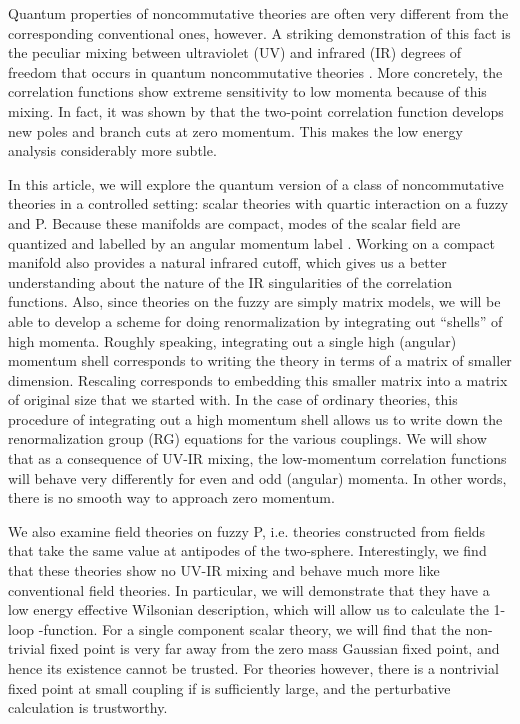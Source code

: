 \documentclass[a4paper,12pt]{article}
\numberwithin{equation}{section}
\begin{document}
Quantum properties of noncommutative theories are often very different
from the corresponding conventional ones, however. A striking
demonstration of this fact is the peculiar mixing between ultraviolet
(UV) and infrared (IR) degrees of freedom that occurs in quantum
noncommutative theories \cite{mrs}. More concretely, the correlation
functions show extreme sensitivity to low momenta because of this
mixing. In fact, it was shown by \cite{mrs} that the two-point
correlation function develops new poles and branch cuts at zero
momentum. This makes the low energy analysis considerably more subtle.

In this article, we will explore the quantum version of a class of
noncommutative theories in a controlled setting: scalar theories with
quartic interaction on a fuzzy \coordHE{} and \coordHE{}P\coordHE{}. Because
these manifolds are compact, modes of the scalar field are quantized
and labelled by an angular momentum label \coordHE{}. Working on a compact
manifold also provides a natural infrared cutoff, which gives us a
better understanding about the nature of the IR singularities of the
correlation functions. Also, since theories on the fuzzy \coordHE{} are
simply matrix models, we will be able to develop a scheme for doing
renormalization by integrating out ``shells'' of high momenta. Roughly
speaking, integrating out a single high (angular) momentum shell
corresponds to writing the theory in terms of a matrix of smaller
dimension. Rescaling corresponds to embedding this smaller matrix into
a matrix of original size that we started with. In the case of
ordinary theories, this procedure of integrating out a high momentum
shell allows us to write down the renormalization group (RG) equations
for the various couplings. We will show that as a consequence of UV-IR
mixing, the low-momentum correlation functions will behave very
differently for even and odd (angular) momenta. In other words, there
is no smooth way to approach zero momentum.

We also examine field theories on fuzzy \coordHE{}P\coordHE{},
i.e. theories constructed from fields that take the same value at
antipodes of the two-sphere. Interestingly, we find that these
theories show no UV-IR mixing and behave much more like conventional
field theories. In particular, we will demonstrate that they have a
low energy effective Wilsonian description, which will allow us to
calculate the 1-loop \myHighlight{$\beta$}\coordHE{}-function. For a single component scalar
theory, we will find that the non-trivial fixed point is very far away
from the zero mass Gaussian fixed point, and hence its existence
cannot be trusted. For \coordHE{} theories however, there is a nontrivial
fixed point at small coupling if \coordHE{} is sufficiently large, and the
perturbative calculation is trustworthy.
\end{document}
